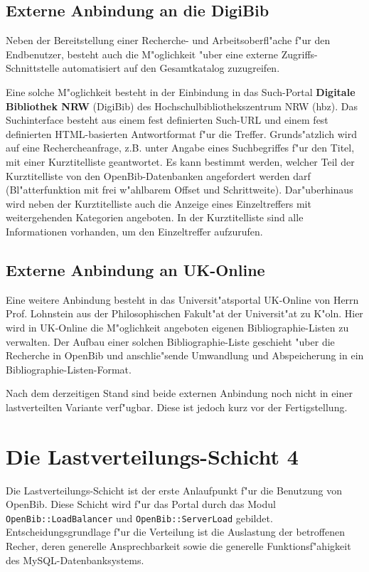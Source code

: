 \documentclass[11pt, twoside, a4paper, BCOR8mm, DIV12, bibtotoc,idxtotoc]{scrbook}
\begin{document}
\subsection{Externe Anbindung an die DigiBib}

Neben der Bereitstellung einer Recherche- und Arbeitsoberfl"ache f"ur
den Endbenutzer, besteht auch die M"oglichkeit "uber eine externe
Zugriffs-Schnittstelle automatisiert auf den Gesamtkatalog
zuzugreifen.

Eine solche M"oglichkeit besteht in der Einbindung in das Such-Portal
\textbf{Digitale Bibliothek NRW} (DigiBib) des
Hoch\-schul\-bibliotheks\-zentrum NRW (hbz). Das Suchinterface besteht aus
einem fest definierten Such-URL und einem fest definierten
HTML-basierten Antwortformat f"ur die Treffer. Grunds"atzlich wird auf
eine Rechercheanfrage, z.B. unter Angabe eines Suchbegriffes f"ur den
Titel, mit einer Kurztitelliste geantwortet. Es kann bestimmt werden,
welcher Teil der Kurztitelliste von den OpenBib-Daten\-banken
angefordert werden darf (Bl"atterfunktion mit frei w"ahlbarem Offset
und Schrittweite). Dar"uberhinaus wird neben der Kurztitelliste auch
die Anzeige eines Einzeltreffers mit weiter\-gehen\-den Kategorien
angeboten. In der Kurztitelliste sind alle Informationen vorhanden, um
den Einzeltreffer aufzurufen.

\subsection{Externe Anbindung an UK-Online}

Eine weitere Anbindung besteht in das Universit"atsportal UK-Online
von Herrn Prof. Lohnstein aus der Philosophischen Fakult"at der
Universit"at zu K"oln. Hier wird in UK-Online die M"oglichkeit
angeboten eigenen Bibliographie-Listen zu verwalten. Der Aufbau einer
solchen Bibliographie-Liste geschieht "uber die Recherche in OpenBib
und anschlie"sende Umwandlung und Ab\-spei\-cherung in ein
Bibliographie-Listen-Format.

Nach dem derzeitigen Stand sind beide externen Anbindung noch nicht in
einer lastverteilten Variante verf"ugbar. Diese ist jedoch kurz vor
der Fertigstellung.

\section{Die Lastverteilungs-Schicht 4}

Die Lastverteilungs-Schicht ist der erste Anlaufpunkt f"ur die
Benutzung von OpenBib. Diese Schicht wird f"ur das Portal durch das
Modul \texttt{OpenBib::LoadBalancer} und \texttt{OpenBib::ServerLoad} gebildet.
Entscheidungsgrundlage f"ur die Verteilung ist die Auslastung der
betroffenen Recher, deren generelle Ansprechbarkeit sowie die
generelle Funktionsf"ahigkeit des MySQL-Datenbanksystems.
\end{document}

